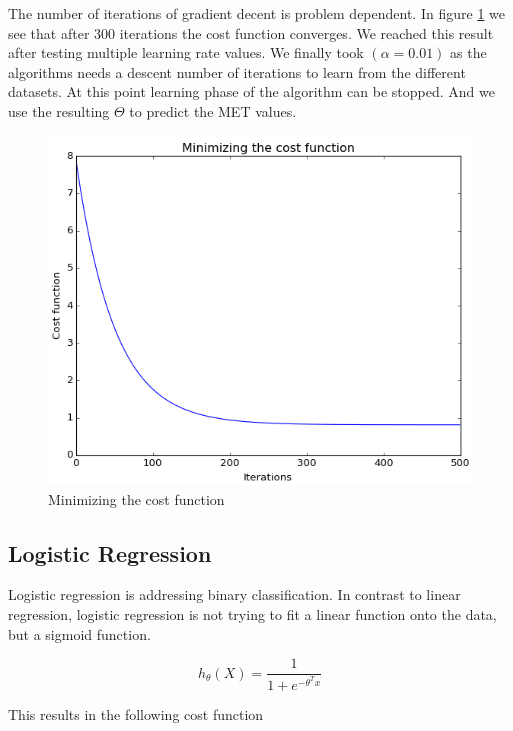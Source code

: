 \documentclass[12pt, a4paper, onecolumn, oneside, parskip=half]{scrartcl}
\begin{document}
The number of iterations of gradient decent is problem dependent. In figure \ref{fig:Minimizing the cost function} we see that after 300 iterations the cost function converges. We reached this result after testing multiple learning rate values. We finally took $(\alpha = 0.01)$ as the algorithms needs a descent number of iterations to learn from the different datasets.
At this point learning phase of the algorithm can be stopped. And we use the resulting $\Theta$ to predict the MET values.

\begin{figure}[H]
  \centering
  \includegraphics[width=130mm]{pictures/cost_function.png}
  \caption{Minimizing the cost function \label{fig:Minimizing the cost function}}
\end{figure}



\subsection{Logistic Regression}

Logistic regression is addressing binary classification. In contrast to linear regression, logistic regression is not trying to fit a linear function onto the data, but a sigmoid function. 

\begin{equation}
\label{eq:model_log_reg}
 h_\theta(X)= \frac{1}{1 + e^{-\theta^T x}}
\end{equation}

This results in the following cost function
\end{document}
